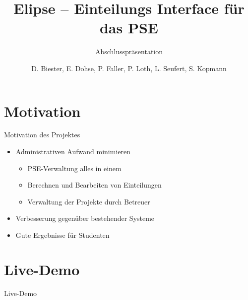 \documentclass[18pt]{beamer}
\title[Elipse]{Elipse -- Einteilungs Interface für das PSE}
\subtitle{Abschlusspräsentation}
\author{D. Biester, E. Dohse, P. Faller, P. Loth, L. Seufert, S. Kopmann}
\institute{IPD Snelting}
\begin{document}

\begin{frame}
\titlepage
\end{frame}


\section{Motivation}
\begin{frame}{Motivation des Projektes}
\begin{itemize}
\item Administrativen Aufwand minimieren
\begin{itemize}
  \item PSE-Verwaltung alles in einem
  \item Berechnen und Bearbeiten von Einteilungen
  \item Verwaltung der Projekte durch Betreuer
    \end{itemize}
\item Verbesserung gegenüber bestehender Systeme
\item Gute Ergebnisse für Studenten

\end{itemize}
\end{frame}

\section{Live-Demo}
\begin{frame}
 \begin{center}
  \Huge Live-Demo
 \end{center}
\end{frame}
\end{document}
